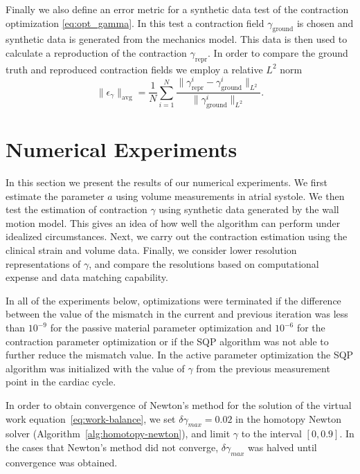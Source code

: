 Finally we also define an error metric for a synthetic
data test of the contraction optimization \eqref{eq:opt_gamma}. In this
test a contraction field $\gamma_{\text{ground}}$ is chosen and 
synthetic data is generated from the 
mechanics model. This data is then used to calculate a
reproduction of the contraction $\gamma_{\text{repr}}$. 
In order to compare the ground truth and reproduced contraction 
fields we employ a relative $L^2$ norm
\begin{equation}
  \| \epsilon_{\gamma} \|_{\text{avg}} = \frac{1}{N} \sum_{i = 1}^{N}  \frac{\| \gamma_{\text{repr}}^{i} -
  \gamma_{\text{ground}}^{i} \|_{L^2}}{ \| \gamma_{\text{ground}}^{i} \|_{L^2}}.
\label{eq:error_gamma}
\end{equation}

\section{Numerical Experiments}
\label{sec:num_results}
In this section we present the results of our numerical experiments.
We first estimate the parameter $a$ using volume measurements in atrial systole.
We then test the estimation of contraction $\gamma$ using synthetic data generated
by the wall motion model. This gives an idea of how well the algorithm
can perform under idealized circumstances.  Next, we
carry out the contraction estimation using the clinical strain and volume data.
Finally, we consider lower resolution representations of $\gamma$, and compare 
the resolutions based on computational expense and data matching capability.

In all of the experiments below, optimizations were terminated if the
difference between the value of the mismatch in the current and
previous iteration was less than $10^{-9}$ for the passive material
parameter optimization and $10^{-6}$ for the contraction
parameter optimization or if the
SQP algorithm was not able to further reduce the mismatch value.
In the active parameter optimization the SQP
algorithm was initialized with the value of $\gamma$ from the previous
measurement point in the cardiac cycle. 

In order to obtain convergence of Newton's method for the solution of
the virtual work equation~\eqref{eq:work-balance}, we set $\delta
\gamma_{max} = 0.02$ in the homotopy Newton solver
(Algorithm~\ref{alg:homotopy-newton}), and 
limit $\gamma$ to the interval $[0, 0.9]$. In the cases that Newton's
method did not converge, $\delta \gamma_{max}$ was halved until convergence was obtained. 

